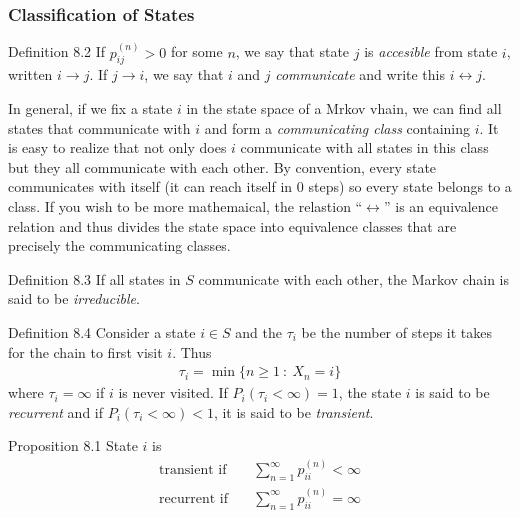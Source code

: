 \subsubsection{Classification of States}
\begin{boks}{Definition 8.2}
  If $p_{ij}^{(n)} > 0$ for some $n$, we say that state $j$ is \textit{accesible} from state $i$, written $i \rightarrow j$. If $j \rightarrow i$, we say that $i$ and $j$ \textit{communicate} and write this $i \leftrightarrow j$.
\end{boks}
In general, if we fix a state $i$ in the state space of a Mrkov vhain, we can find all states that communicate with $i$ and form a \textit{communicating class} containing $i$. It is easy to realize that not only does $i$ communicate with all states in this class but they all communicate with each other. By convention, every state communicates with itself (it can reach itself in $0$ steps) so every state belongs to a class.
If you wish to be more mathemaical, the relastion ``$\leftrightarrow$'' is an equivalence relation and thus divides the state space into equivalence classes that are precisely the communicating classes.
\begin{boks}{Definition 8.3}
  If all states in $S$ communicate with each other, the Markov chain is said to be \textit{irreducible}.
\end{boks}
\begin{boks}{Definition 8.4}
  Consider a state $i \in S$ and the $\tau_i$ be the number of steps it takes for the chain to first visit $i$. Thus
  \begin{align*}
    \tau_i = \min \{ n \geq 1 \ : \ X_n = i \}
  \end{align*}
  where $\tau_i = \infty$ if $i$ is never visited. If $P_i(\tau_i < \infty) = 1$, the state $i$ is said to be \textit{recurrent} and if $P_i(\tau_i < \infty) < 1$, it is said to be \textit{transient}.
\end{boks}
\begin{boks}{Proposition 8.1}
  State $i$ is
  \begin{align*}
    \text{transient if} \quad &\sum_{n = 1}^\infty p_{ii}^{(n)} < \infty \\
    \text{recurrent if} \quad &\sum_{n = 1}^\infty p_{ii}^{(n)} = \infty
  \end{align*}
\end{boks}

